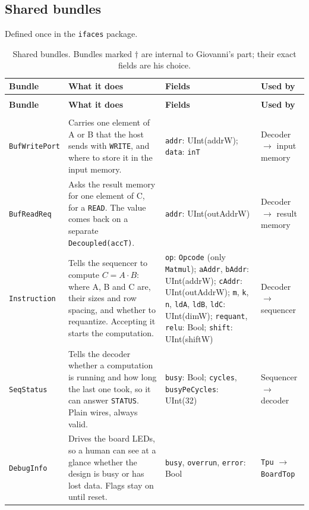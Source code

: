 \documentclass{article}
\begin{document}
\subsection*{Shared bundles}
Defined once in the \texttt{ifaces} package.

\begin{landscape}
{\small\renewcommand{\arraystretch}{1.3}
\begin{xltabular}{\linewidth}{@{} >{\raggedright\arraybackslash}p{3.3cm} >{\raggedright\arraybackslash}p{6.2cm} Y >{\raggedright\arraybackslash}p{3.4cm} @{}}
  \caption{Shared bundles. Bundles marked $\dagger$ are internal to Giovanni's part; their exact fields are his choice.}\label{tab:bundles}\\
  \toprule
  \textbf{Bundle} & \textbf{What it does} & \textbf{Fields} & \textbf{Used by} \\
  \midrule
  \endfirsthead
  \\
  \toprule
  \textbf{Bundle} & \textbf{What it does} & \textbf{Fields} & \textbf{Used by} \\
  \midrule
  \endhead
  \bottomrule
  \endlastfoot

   \\[2pt]
  \texttt{BufWritePort}
    & Carries one element of A or B that the host sends with \texttt{WRITE}, and where to store it in the input memory.
    & \texttt{addr}: UInt(addrW); \texttt{data}: \texttt{inT}
    & Decoder $\rightarrow$ input memory \\
  \texttt{BufReadReq}
    & Asks the result memory for one element of C, for a \texttt{READ}. The value comes back on a separate \texttt{Decoupled(accT)}.
    & \texttt{addr}: UInt(outAddrW)
    & Decoder $\rightarrow$ result memory \\
  \texttt{Instruction}
    & Tells the sequencer to compute $C = A \cdot B$: where A, B and C are, their sizes and row spacing, and whether to requantize. Accepting it starts the computation.
    & \texttt{op}: \texttt{Opcode} (only \texttt{Matmul}); \texttt{aAddr}, \texttt{bAddr}: UInt(addrW); \texttt{cAddr}: UInt(outAddrW);
      \texttt{m}, \texttt{k}, \texttt{n}, \texttt{ldA}, \texttt{ldB}, \texttt{ldC}: UInt(dimW); \texttt{requant}, \texttt{relu}: Bool;
      \texttt{shift}: UInt(shiftW)
    & Decoder $\rightarrow$ sequencer \\
  \texttt{SeqStatus}
    & Tells the decoder whether a computation is running and how long the last one took, so it can answer \texttt{STATUS}. Plain wires, always valid.
    & \texttt{busy}: Bool; \texttt{cycles}, \texttt{busyPeCycles}: UInt(32)
    & Sequencer $\rightarrow$ decoder \\
  \texttt{DebugInfo}
    & Drives the board LEDs, so a human can see at a glance whether the design is busy or has lost data. Flags stay on until reset.
    & \texttt{busy}, \texttt{overrun}, \texttt{error}: Bool
    & \texttt{Tpu} $\rightarrow$ \texttt{BoardTop} \\
  \midrule


\end{xltabular}}
\end{landscape}
\end{document}
